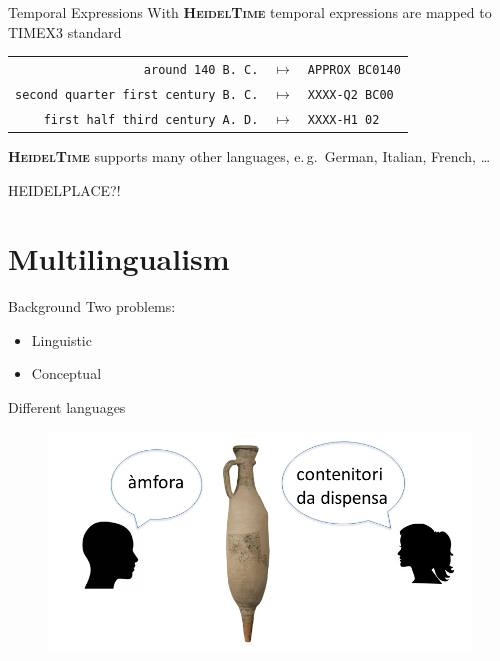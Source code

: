 \documentclass[xcolor=x11names, aspectratio=169,usenames,dvipsnames]{beamer}
\begin{document}
\begin{frame}{Temporal Expressions}
With \textbf{\textsc{HeidelTime}} temporal expressions are mapped to TIMEX3 standard
\begin{center}
{\renewcommand{\arraystretch}{1.2}%
\begin{tabular}{rcl}
\texttt{around 140 B.\,C.}&$\longmapsto$&\texttt{APPROX BC0140}\\
\texttt{second quarter first century B.\,C.}&$\longmapsto$&\texttt{XXXX-Q2 BC00}\\
\texttt{first half third century A.\,D.}&$\longmapsto$&\texttt{XXXX-H1 02}\\
\end{tabular}
}
\end{center}
\pause
\textbf{\textsc{HeidelTime}} supports many other languages, e.\,g.\ German, Italian, French, \dots

HEIDELPLACE?!
\end{frame}

\section{Multilingualism}

\begin{frame}{Background}
Two problems:
\begin{itemize}
\item Linguistic
\item Conceptual
\end{itemize}
\end{frame}

\begin{frame}{Different languages}
\begin{center}
\begin{figure}
\includegraphics[width=\textwidth]{img/tim_vocab_1.png}
\end{figure}
\end{center}
\end{frame}
\end{document}

